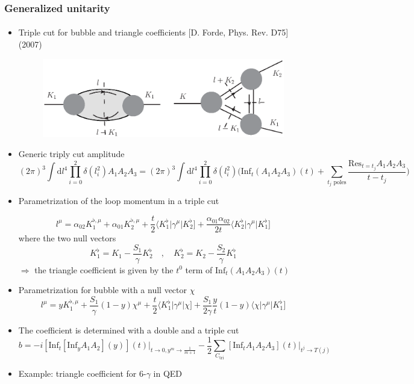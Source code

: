 \documentclass[english]{beamer}
\newcommand{\dd}{\textrm{d}}
\newcommand{\res}{\mathrm{Res}}
\newcommand{\Inf}{\mathrm{Inf}}
\begin{document}
\begin{frame}[shrink=10]
\frametitle{Generalized unitarity}
\framesubtitle{}
\begin{itemize}
\item<1-> Triple cut for bubble and triangle coefficients
\tiny\color{blue}
[D. Forde, Phys. Rev. D75]
(2007)
\color{black}\normalsize
\begin{figure}[h]
  \centering
  \includegraphics[width=0.5\linewidth]{triple_cut.eps}
\end{figure}

\item<2-> Generic triply cut amplitude
\small
\begin{equation*}
(2\pi)^3\int\dd l^4 \prod_{i=0}^2 \delta(l_i^2) A_1A_2A_3 = 
(2\pi)^3\int\dd l^4 \prod_{i=0}^2 \delta(l_i^2)\Big(\mathrm{Inf}_t(A_1A_2A_3)(t) + \sum_{\textrm{$t_j$ poles}}\frac{\res_{t = t_j}A_1 A_2 A_3}{t-t_j}\Big)
\end{equation*}
\normalsize
\item<3-> Parametrization of the loop momentum in a triple cut

\small
\begin{equation*}
l^\mu = \alpha_{02} K_1^{\flat,\mu} + \alpha_{01}K_2^{\flat,\mu} + \frac{t}{2}\langle K_1^\flat | \gamma^\mu |K_2^\flat] + \frac{\alpha_{01}\alpha_{02}}{2t}\langle K_2^\flat|\gamma^\mu |K_1^\flat]
\end{equation*}
\normalsize
where the two null vectors
\small
\begin{equation*}
K_1^\flat = K_1 - \frac{S_1}{\gamma}K_2^\flat \quad,\quad
K_2^\flat = K_2 - \frac{S_2}{\gamma}K_1^\flat
\end{equation*}
\normalsize
$\Rightarrow$ the triangle coefficient is given by the $t^0$ term of $\mathrm{Inf}_t(A_1A_2A_3)(t)$

\item<4-> Parametrization for bubble with a null vector $\chi$
\small
\begin{equation*}
l^\mu = yK_1^{\flat,\mu} + \frac{S_1}{\gamma}(1-y)\chi^\mu + \frac{t}{2}\langle K_1^\flat|\gamma^\mu|\chi] + \frac{S_1}{2\gamma}\frac{y}{t}(1-y)\langle \chi|\gamma^\mu|K_1^\flat]
\end{equation*}
\normalsize
\item<5->[]
The coefficient is determined with a double and a triple cut
\begin{equation*}
b = -i[\Inf_t[\Inf_y A_1 A_2](y)](t)\big|_{t\rightarrow 0 , y^m\rightarrow \frac{1}{m+1}}
-\frac{1}{2}\sum_{C_{\mathrm{tri}}}[\Inf_t A_1A_2A_3](t)\big|_{t^j\rightarrow T(j)}
\end{equation*} 

\item<6-> Example: triangle coefficient for 6-$\gamma$ in QED

\end{itemize}

\end{frame}
\end{document}
